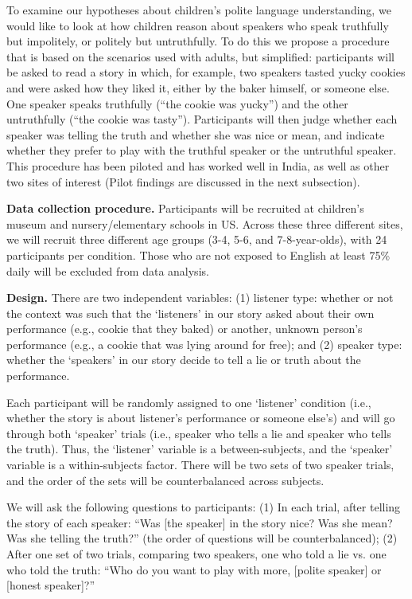 To examine our hypotheses about children's polite language understanding, we would like to look at how children reason about speakers who speak truthfully but impolitely, or politely but untruthfully. To do this we propose a procedure that is based on the scenarios used with adults, but simplified: participants will be asked to read a story in which, for example, two speakers tasted yucky cookies and were asked how they liked it, either by the baker himself, or someone else. One speaker speaks truthfully (``the cookie was yucky'') and the other untruthfully (``the cookie was tasty''). Participants will then judge whether each speaker was telling the truth and whether she was nice or mean, and indicate whether they prefer to play with the truthful speaker or the untruthful speaker. This procedure has been piloted and has worked well in India, as well as other two sites of interest (Pilot findings are discussed in the next subsection).
 
{\bf Data collection procedure.} Participants will be recruited at children's museum and nursery/elementary schools in US. Across these three different sites, we will recruit three different age groups (3-4, 5-6, and 7-8-year-olds), with 24 participants per condition. Those who are not exposed to English at least 75\% daily will be excluded from data analysis. 

{\bf Design.} There are two independent variables: (1) listener type: whether or not the context was such that the `listeners' in our story asked about their own performance (e.g., cookie that they baked) or another, unknown person's performance (e.g., a cookie that was lying around for free); and (2) speaker type: whether the `speakers' in our story decide to tell a lie or truth about the performance. 

Each participant will be randomly assigned to one `listener' condition (i.e., whether the story is about listener's performance or someone else's) and will go through both `speaker' trials (i.e., speaker who tells a lie and speaker who tells the truth). Thus, the `listener' variable is a between-subjects, and the `speaker' variable is a within-subjects factor. There will be two sets of two speaker trials, and the order of the sets will be counterbalanced across subjects.

We will ask the following questions to participants: (1) In each trial, after telling the story of each speaker: ``Was [the speaker] in the story nice? Was she mean? Was she telling the truth?'' (the order of questions will be counterbalanced); (2) After one set of two trials, comparing two speakers, one who told a lie vs. one who told the truth: ``Who do you want to play with more, [polite speaker] or [honest speaker]?''

